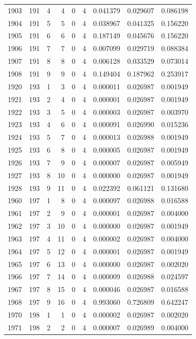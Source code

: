 \begin{longtable}{rrrrrrrrr}
1903 & 191 & 4 & 4 & 0 & 4 & 0.041379 & 0.029607 & 0.086198 \\
1904 & 191 & 5 & 5 & 0 & 4 & 0.038967 & 0.041325 & 0.156220 \\
1905 & 191 & 6 & 6 & 0 & 4 & 0.187149 & 0.045676 & 0.156220 \\
1906 & 191 & 7 & 7 & 0 & 4 & 0.007099 & 0.029719 & 0.088384 \\
1907 & 191 & 8 & 8 & 0 & 4 & 0.006128 & 0.033529 & 0.073014 \\
1908 & 191 & 9 & 9 & 0 & 4 & 0.149404 & 0.187962 & 0.253917 \\
1920 & 193 & 1 & 3 & 0 & 4 & 0.000011 & 0.026987 & 0.001949 \\
1921 & 193 & 2 & 4 & 0 & 4 & 0.000001 & 0.026987 & 0.001949 \\
1922 & 193 & 3 & 5 & 0 & 4 & 0.000003 & 0.026987 & 0.003970 \\
1923 & 193 & 4 & 6 & 0 & 4 & 0.000091 & 0.026990 & 0.015236 \\
1924 & 193 & 5 & 7 & 0 & 4 & 0.000013 & 0.026988 & 0.001949 \\
1925 & 193 & 6 & 8 & 0 & 4 & 0.000005 & 0.026987 & 0.001949 \\
1926 & 193 & 7 & 9 & 0 & 4 & 0.000007 & 0.026987 & 0.005949 \\
1927 & 193 & 8 & 10 & 0 & 4 & 0.000000 & 0.026987 & 0.001949 \\
1928 & 193 & 9 & 11 & 0 & 4 & 0.022392 & 0.061121 & 0.131680 \\
1960 & 197 & 1 & 8 & 0 & 4 & 0.000097 & 0.026988 & 0.016588 \\
1961 & 197 & 2 & 9 & 0 & 4 & 0.000001 & 0.026987 & 0.004000 \\
1962 & 197 & 3 & 10 & 0 & 4 & 0.000000 & 0.026987 & 0.001949 \\
1963 & 197 & 4 & 11 & 0 & 4 & 0.000002 & 0.026987 & 0.004000 \\
1964 & 197 & 5 & 12 & 0 & 4 & 0.000001 & 0.026987 & 0.001949 \\
1965 & 197 & 6 & 13 & 0 & 4 & 0.000000 & 0.026987 & 0.002020 \\
1966 & 197 & 7 & 14 & 0 & 4 & 0.000009 & 0.026988 & 0.024597 \\
1967 & 197 & 8 & 15 & 0 & 4 & 0.000046 & 0.026987 & 0.016588 \\
1968 & 197 & 9 & 16 & 0 & 4 & 0.993060 & 0.726809 & 0.642247 \\
1970 & 198 & 1 & 1 & 0 & 4 & 0.000002 & 0.026987 & 0.002020 \\
1971 & 198 & 2 & 2 & 0 & 4 & 0.000007 & 0.026989 & 0.004000 \\

\end{longtable}
